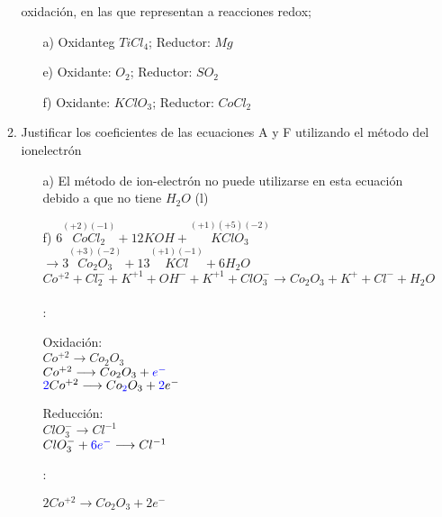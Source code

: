 \documentclass[../Práctica.root.tex]{subfiles}
\newcommand{\lra}{\ensuremath{\longrightarrow{}}}
\newcommand{\sr}[2]{\stackrel{#1}{#2}}
\begin{document}
\begin{enumerate}
\begin{enumerate}
                    oxidación, en las que representan a reacciones redox;
                    \begin{enumerate}
                        \item[a)] Oxidanteg $TiCl_4$; Reductor: $Mg$
                        \item[e)] Oxidante: $O_2$; Reductor: $SO_2$
                        \item[f)] Oxidante: $KClO_3$; Reductor: $CoCl_2$
                    \end{enumerate}
              \item Justificar los coeficientes de las ecuaciones A y F utilizando el método del ionelectrón
                    \begin{itemize}
                        \item[a)] El método de ion-electrón no puede utilizarse en esta ecuación debido a que no tiene $H_2O$ (l)
                        \item[f)] $6 \sr{(+2)(-1)}{CoCl_2} + 12 KOH + \sr{(+1)(+5)(-2)}{KClO_3}$
                              $\lra 3 \sr{(+3)(-2)}{Co_2O_3} + 13 \sr{(+1)(-1)}{KCl} + 6 H_2O$ \\
                              $Co^{+2} + Cl_2^- + K^{+1} + OH^- + K^{+1} + ClO_3^- \lra Co_2O_3 + K^+ + Cl^- + H_2O$ \\ \\
                              :
                              \begin{multicols}{2}
                                  Oxidación: \\
                                  $Co^{+2} \lra Co_2O_3$ \\
                                  $Co^{+2} \lra Co_2O_3 + \blue{e^-}$ \\
                                  $\blue{2} Co^{+2} \lra Co\blue{_2}O_3 + \blue{2}e^-$

                                  \columnbreak

                                  Reducción: \\
                                  $ClO_3^- \lra Cl^{-1}$ \\
                                  $ClO_3^- + \blue{6e^-} \lra Cl^{-1}$
                              \end{multicols}
                              :
                              \begin{multicols}{2}
                                  $2 Co^{+2} \lra Co_2O_3 + 2 e^-$


\end{multicols}
\end{itemize}
\end{enumerate}
\end{enumerate}
\end{document}
